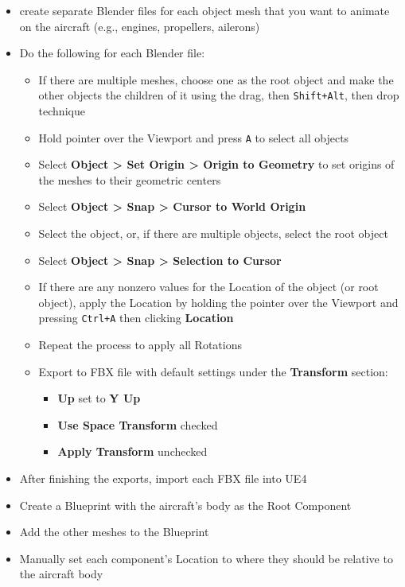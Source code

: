\begin{itemize}
    \item create separate  Blender files for each object mesh that you want to animate on the aircraft (e.g., engines, propellers, ailerons)
    \item Do the following for each Blender file:
    \begin{itemize}
        \item If there are multiple meshes, choose one as the root object and make the other objects the children of it using the drag, then \texttt{Shift+Alt}, then drop technique
        \item Hold pointer over the Viewport and press \texttt{A} to select all objects
        \item Select \textbf{Object > Set Origin > Origin to Geometry} to set origins of the meshes to their geometric centers
        \item Select \textbf{Object > Snap > Cursor to World Origin}
        \item Select the object, or, if there are multiple objects, select the root object
        \item Select \textbf{Object > Snap > Selection to Cursor}
        \item If there are any nonzero values for the Location of the object (or root object), apply the Location by holding the pointer over the Viewport and pressing \texttt{Ctrl+A} then clicking \textbf{Location}
        \item Repeat the process to apply all Rotations
        \item Export to FBX file with default settings under the \textbf{Transform} section:
        \begin{itemize}
            \item \textbf{Up} set to \textbf{Y Up}
            \item \textbf{Use Space Transform} checked
            \item \textbf{Apply Transform} unchecked
        \end{itemize}
    \end{itemize}
    \item After finishing the exports, import each FBX file into UE4
    \item Create a Blueprint with the aircraft's body as the Root Component
    \item Add the other meshes to the Blueprint
    \item Manually set each component's Location to where they should be relative to the aircraft body
\end{itemize}
